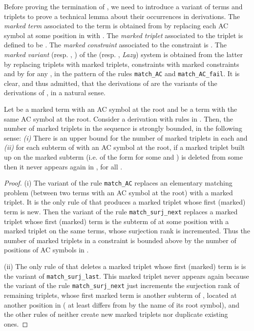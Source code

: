 \documentclass[submission,copyright,creativecommons]{eptcs}
\numberwithin{subcase}{case}
\begin{document}
 Before proving the termination of
, we need to introduce a variant of
terms and triplets to prove a technical lemma about their occurrences in
derivations.
The \emph{marked term}  associated to the term  is obtained from  by
replacing each AC symbol  at some position  in  with . 
The
\emph{marked triplet} associated to the triplet  is defined to be
. The \emph{marked constraint} associated to the
constraint  is .
The \emph{marked variant}  (resp.
, ) of the  (resp.
, \textit{Lazy}) system is obtained from the latter by
replacing triplets with marked triplets, constraints with marked constraints and
 by  for any , in the pattern  of the rules
\texttt{match\_AC} and \texttt{match\_AC\_fail}. It is clear, and thus admitted,
that the derivations of  are the variants of the derivations
of , in a natural sense. 

 
\begin{lemma}\label{bounded:triplet:lemma}
Let  be a marked term with an AC symbol at the root and  be a term with
the same AC symbol at the root. Consider a derivation  with rules in . Then, the
 number of marked triplets in the sequence  is strongly bounded,
 in the following sense:
\emph{(i)} There is an upper bound for the number of marked triplets in each
 and \emph{(ii)} for each subterm  of  with an AC symbol at the root,
if a marked triplet built up on the marked subterm  (i.e. of the form
 for some  and ) is deleted from some  then
it never appears again in , for all .
\end{lemma}

\begin{proof}
(i) The variant of the rule \texttt{match\_AC} replaces an elementary matching
problem (between two terms with an AC symbol at the root) with a marked triplet.
It is the only rule of  that produces a
marked triplet whose first (marked) term is new. Then the variant of the rule
\texttt{match\_surj\_next} replaces a marked triplet whose first (marked) term is
the subterm  of  at some position  with a marked
triplet on the same terms, whose surjection rank is incremented. Thus
the number of marked triplets in a constraint is bounded above by the number of
positions of AC symbols in .

(ii) The only rule of  that deletes a
marked triplet whose first (marked) term is  is the variant of
\texttt{match\_surj\_last}. This marked triplet never appears again because the
variant of the rule \texttt{match\_surj\_next} just increments the surjection
rank of remaining triplets, whose first marked term  is another subterm of
, located at another position in  ( at least differs from  by the
name of its root symbol), and the other rules of  neither create new marked triplets nor duplicate existing
ones.
\end{proof}
\end{document}
